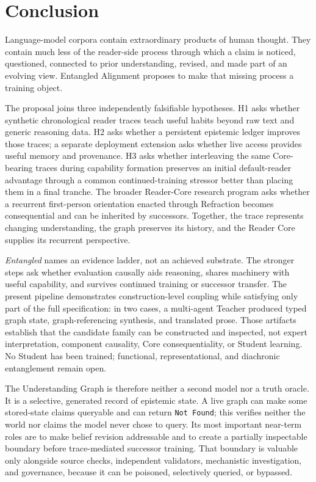 	\section{Conclusion}\label{sec:conclusion}

Language-model corpora contain extraordinary products of human thought. They
contain much less of the reader-side process through which a claim is noticed,
questioned, connected to prior understanding, revised, and made part of an
evolving view. Entangled Alignment proposes to make that missing process a
training object.

The proposal joins three independently falsifiable hypotheses. H1 asks whether
synthetic chronological reader traces teach useful habits beyond raw text and
generic reasoning data. H2 asks whether a persistent epistemic ledger improves
those traces; a separate deployment extension asks whether live access provides
useful memory and provenance. H3 asks whether
interleaving the same Core-bearing traces during capability formation preserves
an initial default-reader advantage through a common continued-training stressor
better than placing them in a final tranche. The broader Reader-Core research program asks whether a recurrent
first-person orientation enacted through Refraction becomes consequential and
can be inherited by successors. Together,
the trace represents changing understanding, the graph preserves its history,
and the Reader Core supplies its recurrent perspective.

\emph{Entangled} names an evidence ladder, not an achieved substrate. The stronger
steps ask whether evaluation causally aids reasoning, shares machinery with
useful capability, and survives continued training or successor transfer. The
present pipeline demonstrates construction-level coupling while satisfying
only part of the full specification: in two cases, a
multi-agent Teacher produced typed graph state, graph-referencing synthesis, and
translated prose. Those artifacts establish that the candidate family can be
constructed and inspected, not expert interpretation, component causality, Core
consequentiality, or Student learning. No Student has been trained; functional,
representational, and diachronic entanglement remain open.

The Understanding Graph is therefore neither a second model nor a truth oracle.
It is a selective, generated record of epistemic state. A live graph can make
some stored-state claims queryable and can return \texttt{Not Found}; this
verifies neither the world nor claims the model never chose to query. Its most
important near-term roles are to make belief revision addressable and to create
a partially inspectable boundary before trace-mediated successor training.
That boundary is valuable only alongside source checks, independent validators,
mechanistic investigation, and governance, because it can be poisoned,
selectively queried, or bypassed.

